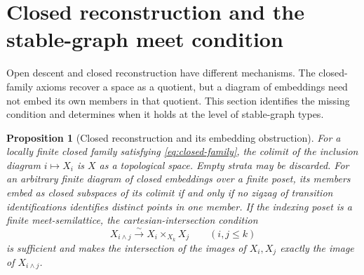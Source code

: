 \documentclass[11pt,a4paper]{article}
\newtheorem{proposition}[theorem]{Proposition}
\theoremstyle{definition}
\begin{document}
\section{Closed reconstruction and the stable-graph meet condition}\label{sec:closed-graphs}
Open descent and closed reconstruction have different mechanisms. The
closed-family axioms recover a space as a quotient, but a diagram of
embeddings need not embed its own members in that quotient. This section
identifies the missing condition and determines when it holds at the
level of stable-graph types.

\begin{proposition}[Closed reconstruction and its embedding obstruction]\label{prop:closed-reconstruction}
For a locally finite closed family satisfying \eqref{eq:closed-family},
the colimit of the inclusion diagram $i\mapsto X_i$ is $X$ as a
topological space. Empty strata may be discarded.
For an arbitrary finite diagram of closed embeddings over a finite
poset, its members embed as closed subspaces of its colimit if and
only if no zigzag of transition identifications identifies distinct
points in one member. If the indexing poset is a finite
meet-semilattice, the cartesian-intersection condition
\[
 X_{i\wedge j}\xrightarrow{\sim}X_i\times_{X_k}X_j
 \qquad(i,j\leq k)
\]
is sufficient and makes the intersection of the images of $X_i,X_j$
exactly the image of $X_{i\wedge j}$.
\end{proposition}
\end{document}
